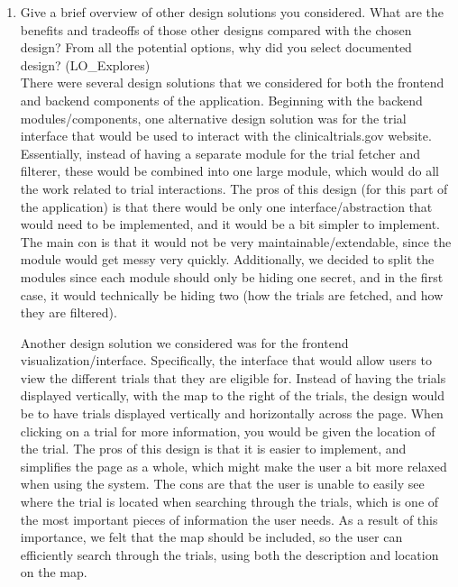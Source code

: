 \documentclass[12pt, titlepage]{article}
\begin{document}
\begin{enumerate}
  \item Give a brief overview of other design solutions you considered.  What
  are the benefits and tradeoffs of those other designs compared with the chosen
  design?  From all the potential options, why did you select documented design?
  (LO\_Explores)\\

  There were several design solutions that we considered for both the frontend and backend components of the application.
  Beginning with the backend modules/components, one alternative design solution was for the trial interface that would be used
  to interact with the clinicaltrials.gov website. Essentially, instead of having a separate module for the trial fetcher and filterer, these 
  would be combined into one large module, which would do all the work related to trial interactions. The pros of this design (for this part 
  of the application) is that there would be only one interface/abstraction that would need to be implemented, and it would be a bit simpler to 
  implement. The main con is that it would not be very maintainable/extendable, since the module would get messy very quickly. Additionally, we 
  decided to split the modules since each module should only be hiding one secret, and in the first case, it would technically be hiding two (how the 
  trials are fetched, and how they are filtered).

  Another design solution we considered was for the frontend visualization/interface. Specifically, the interface that would allow users 
  to view the different trials that they are eligible for. Instead of having the trials displayed vertically, with the map to the right 
  of the trials, the design would be to have trials displayed vertically and horizontally across the page. When clicking on a trial 
  for more information, you would be given the location of the trial. The pros of this design is that it is easier to implement, and simplifies
  the page as a whole, which might make the user a bit more relaxed when using the system. The cons are that the user is unable to easily see where
  the trial is located when searching through the trials, which is one of the most important pieces of information the user needs. As a result of this 
  importance, we felt that the map should be included, so the user can efficiently search through the trials, using both the description
  and location on the map.


\end{enumerate}
\end{document}

